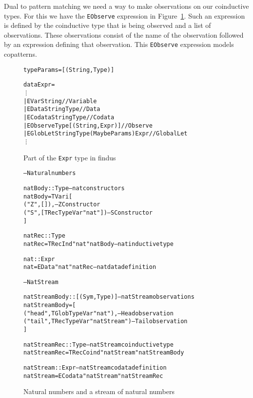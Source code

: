 Dual to pattern matching we need a way to make observations on our coinductive types. For this we have the \texttt{EObserve} expression in Figure~\ref{fig:expr}. Such an expression is defined by the coinductive type that is being observed and a list of observations. These observations consist of the name of the observation followed by an expression defining that observation. This \texttt{EObserve} expression models copatterns.

\begin{figure}
\begin{alltt}
type Params = [(String, Type)]

data Expr =
  \vdots
  | EVar String                              // Variable
  | EData String Type                        // Data
  | ECodata String Type                      // Codata
  | EObserve Type [(String, Expr)]           // Observe
  | EGlobLet String Type (Maybe Params) Expr // Global Let
  \vdots
\end{alltt}
\caption{Part of the \texttt{Expr} type in findus}
\label{fig:expr}
\end{figure}

\begin{figure}
\begin{alltt}
-- Natural numbers

natBody :: Type                         -- nat constructors
natBody = TVari [
            ("Z", []),                  -- Z Constructor
            ("S", [TRecTypeVar "nat"])  -- S Constructor
          ]

natRec :: Type
natRec = TRecInd "nat" natBody          -- nat inductive type

nat :: Expr
nat = EData "nat" natRec                -- nat data definition

-- Nat Stream

natStreamBody :: [(Sym, Type)]          -- natStream observations
natStreamBody = [
                  ("head", TGlobTypeVar "nat"),     -- Head observation
                  ("tail", TRecTypeVar "natStream") -- Tail observation
                ]

natStreamRec :: Type                    -- natStream coinductive type
natStreamRec = TRecCoind "natStream" natStreamBody  

natStream :: Expr                       -- natStream codata definition
natStream = ECodata "natStream" natStreamRec  
\end{alltt}
\caption{Natural numbers and a stream of natural numbers}
\label{fig:natandstream}
\end{figure}

